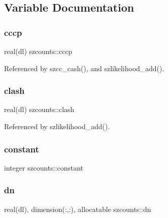 \subsection{Variable Documentation}
\mbox{\label{namespaceszcounts_a64fdba6e458ea314da7f871a1ec879ae}} 
\subsubsection{\texorpdfstring{cccp}{cccp}}
{\footnotesize\ttfamily real(dl) szcounts\+::cccp\hspace{0.3cm}{\ttfamily [private]}}



Referenced by szcc\+\_\+cash(), and szlikelihood\+\_\+add().

\mbox{\label{namespaceszcounts_adffd232373e78bf39d363f027f0564ff}} 
\subsubsection{\texorpdfstring{clash}{clash}}
{\footnotesize\ttfamily real(dl) szcounts\+::clash\hspace{0.3cm}{\ttfamily [private]}}



Referenced by szlikelihood\+\_\+add().

\mbox{\label{namespaceszcounts_a9d5e47bc9753495f7e786d6a346a0430}} 
\subsubsection{\texorpdfstring{constant}{constant}}
{\footnotesize\ttfamily integer szcounts\+::constant\hspace{0.3cm}{\ttfamily [private]}}

\mbox{\label{namespaceszcounts_a169b8a0331217f4777d810a37e5459c2}} 
\subsubsection{\texorpdfstring{dn}{dn}}
{\footnotesize\ttfamily real(dl), dimension(\+:,\+:), allocatable szcounts\+::dn\hspace{0.3cm}{\ttfamily [private]}}



